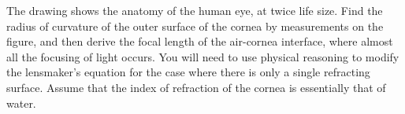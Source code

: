 The drawing shows the anatomy of the human eye, at
twice life size. Find the radius of curvature of the outer
surface of the cornea by measurements on the figure, and
then derive the focal length of the air-cornea interface,
where almost all the focusing of light occurs. You will need
to use physical reasoning to modify the lensmaker's equation
for the case where there is only a single refracting
surface. Assume that the index of refraction of the cornea
is essentially that of water.\answercheck

